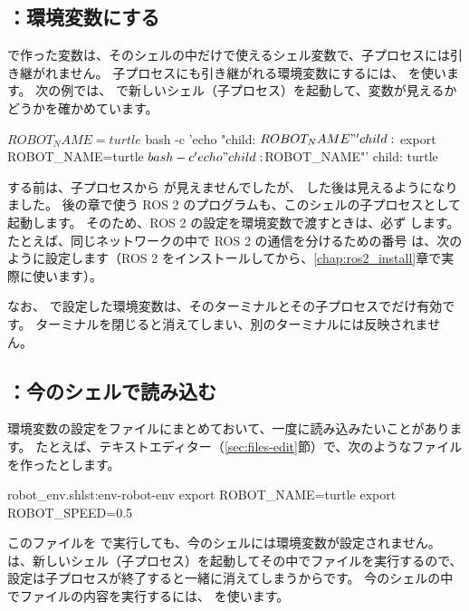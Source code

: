 \subsection{：環境変数にする}

 で作った変数は、そのシェルの中だけで使えるシェル変数で、子プロセスには引き継がれません。
子プロセスにも引き継がれる環境変数にするには、 を使います。
次の例では、 で新しいシェル（子プロセス）を起動して、変数が見えるかどうかを確かめています。

\begin{terminal}[シェル変数と環境変数の違い]
$ ROBOT_NAME=turtle
$ bash -c 'echo "child: $ROBOT_NAME"'
child:
$ export ROBOT_NAME=turtle
$ bash -c 'echo "child: $ROBOT_NAME"'
child: turtle
\end{terminal}

 する前は、子プロセスから  が見えませんでしたが、 した後は見えるようになりました。
後の章で使う ROS 2 のプログラムも、このシェルの子プロセスとして起動します。
そのため、ROS 2 の設定を環境変数で渡すときは、必ず  します。
たとえば、同じネットワークの中で ROS 2 の通信を分けるための番号  は、次のように設定します（ROS 2 をインストールしてから、\ref{chap:ros2_install}章で実際に使います）。


なお、 で設定した環境変数は、そのターミナルとその子プロセスでだけ有効です。
ターミナルを閉じると消えてしまい、別のターミナルには反映されません。

\subsection{：今のシェルで読み込む}

環境変数の設定をファイルにまとめておいて、一度に読み込みたいことがあります。
たとえば、テキストエディター（\ref{sec:files-edit}節）で、次のようなファイル  を作ったとします。

\begin{codelisting}[style=bash]{robot\_env.sh}{lst:env-robot-env}
export ROBOT_NAME=turtle
export ROBOT_SPEED=0.5
\end{codelisting}

このファイルを  で実行しても、今のシェルには環境変数が設定されません。
 は、新しいシェル（子プロセス）を起動してその中でファイルを実行するので、設定は子プロセスが終了すると一緒に消えてしまうからです。
今のシェルの中でファイルの内容を実行するには、 を使います。

